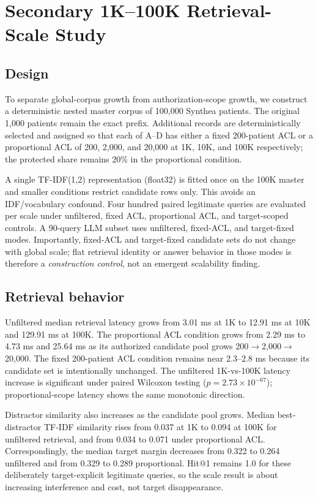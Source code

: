 \section{Secondary 1K--100K Retrieval-Scale Study}
\subsection{Design}
To separate global-corpus growth from authorization-scope growth, we construct a deterministic nested master corpus of 100,000 Synthea patients. The original 1,000 patients remain the exact prefix. Additional records are deterministically selected and assigned so that each of A--D has either a fixed 200-patient ACL or a proportional ACL of 200, 2,000, and 20,000 at 1K, 10K, and 100K respectively; the protected share remains 20\% in the proportional condition.

A single TF-IDF(1,2) representation (float32) is fitted once on the 100K master and smaller conditions restrict candidate rows only. This avoids an IDF/vocabulary confound. Four hundred paired legitimate queries are evaluated per scale under unfiltered, fixed ACL, proportional ACL, and target-scoped controls. A 90-query LLM subset uses unfiltered, fixed-ACL, and target-fixed modes. Importantly, fixed-ACL and target-fixed candidate sets do not change with global scale; flat retrieval identity or answer behavior in those modes is therefore a \emph{construction control}, not an emergent scalability finding.

\subsection{Retrieval behavior}
Unfiltered median retrieval latency grows from 3.01 ms at 1K to 12.91 ms at 10K and 129.91 ms at 100K. The proportional ACL condition grows from 2.29 ms to 4.73 ms and 25.64 ms as its authorized candidate pool grows 200$\rightarrow$2,000$\rightarrow$20,000. The fixed 200-patient ACL condition remains near 2.3--2.8 ms because its candidate set is intentionally unchanged. The unfiltered 1K-vs-100K latency increase is significant under paired Wilcoxon testing ($p=2.73\times10^{-67}$); proportional-scope latency shows the same monotonic direction.

Distractor similarity also increases as the candidate pool grows. Median best-distractor TF-IDF similarity rises from 0.037 at 1K to 0.094 at 100K for unfiltered retrieval, and from 0.034 to 0.071 under proportional ACL. Correspondingly, the median target margin decreases from 0.322 to 0.264 unfiltered and from 0.329 to 0.289 proportional. Hit@1 remains 1.0 for these deliberately target-explicit legitimate queries, so the scale result is about increasing interference and cost, not target disappearance.

